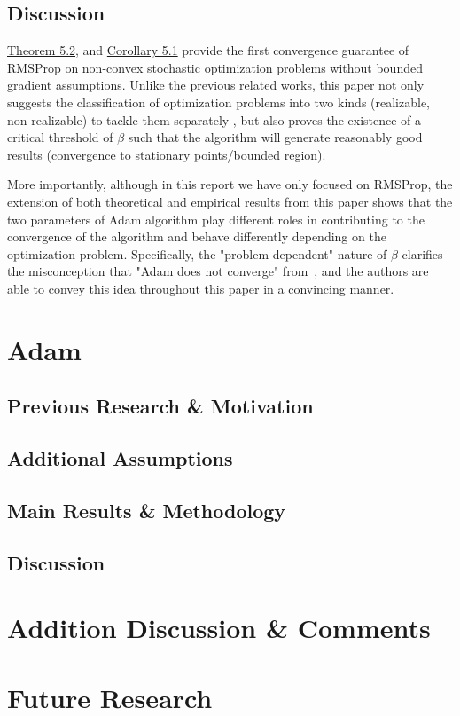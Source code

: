 \documentclass{article}
\begin{document}
\subsection{Discussion}
\hyperref[theom51]{Theorem 5.2}, and \hyperref[coro51]{Corollary 5.1} provide the first convergence guarantee of RMSProp on non-convex stochastic optimization problems without bounded gradient assumptions. Unlike the previous related works, this paper not only suggests the classification of optimization problems into two kinds (realizable, non-realizable) to tackle them separately , but also proves the existence of a critical threshold of $\beta$ such that the algorithm will generate reasonably good results (convergence to stationary points/bounded region).

More importantly, although in this report we have only focused on RMSProp, the extension of both theoretical and empirical results from this paper shows that the two parameters of Adam algorithm play different roles in contributing to the convergence of the algorithm and behave differently depending on the optimization problem. Specifically, the "problem-dependent" nature of $\beta$ clarifies the misconception that "Adam does not converge" from~\cite{https://doi.org/10.48550/arxiv.1904.09237}, and the authors are able to convey this idea throughout this paper in a convincing manner.
\section{Adam}
\label{section7}
\subsection{Previous Research \& Motivation}
\subsection{Additional Assumptions}
\subsection{Main Results \& Methodology}
\subsection{Discussion}
\section{Addition Discussion \& Comments}
\section{Future Research}
\newpage

\end{document}
